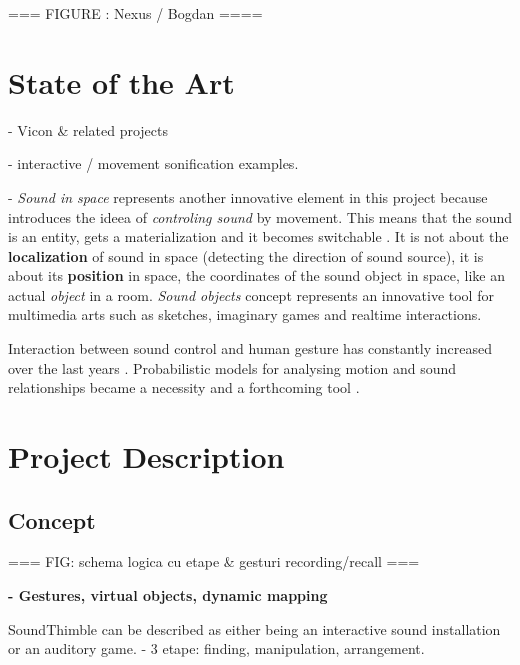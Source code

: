 \documentclass{nime-alternate}
\begin{document}
=== FIGURE : Nexus / Bogdan ====


\section{State of the Art}

- Vicon \& related projects

- interactive / movement sonification examples\cite{hermann2011sonification}.

- \textit{Sound in space} represents another innovative element in this project because introduces the ideea of \textit{controling sound} by movement.
This means that the sound is an entity, gets a materialization and it becomes switchable \cite{soundunseen}. It is not about the \textbf{localization} of sound in space (detecting the direction of sound source), it is about its \textbf{position} in space, the coordinates of the sound object in space, like an actual \textit{object} in a room. \textit{Sound objects} concept represents an innovative tool for multimedia arts such as sketches, imaginary games and realtime interactions.

Interaction between sound control and human gesture has constantly increased over the last years \cite{Gestureanalysis}. Probabilistic models for analysing motion and sound relationships became a necessity and a forthcoming tool \cite{probabilisticmodels}.

\section{Project Description}

\subsection{Concept}

=== FIG: schema logica cu etape \& gesturi recording/recall ===

\textbf{- Gestures, virtual objects, dynamic mapping}\\ \par

SoundThimble can be described as either being an interactive sound installation or an auditory game.
- 3 etape: finding, manipulation, arrangement.
\end{document}
